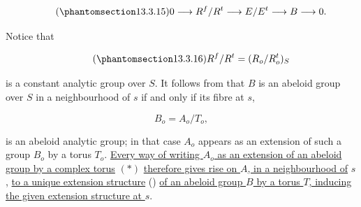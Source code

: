 \begin{equation}\tag{\SGARefTarget{sga7.sga7i.eix.n13-3-15}{13.3.15}}
 0\longrightarrow R^f/R^t\longrightarrow E/E^t
 \longrightarrow B\longrightarrow0.
\end{equation}

\noindent
Notice that

\begin{equation}\tag{\SGARefTarget{sga7.sga7i.eix.n13-3-16}{13.3.16}}
 R^f/R^t=(R_o/R_o^t)_S
\end{equation}

\noindent
is a constant analytic group over $S$. It follows from  that $B$
is an abeloid group over $S$ in a neighbourhood of $s$ if and only if
its fibre at $s$,

\begin{equation*}
 B_o=A_o/T_o,
\end{equation*}

\noindent
is an abeloid analytic group; in that case $A_o$ appears as an extension
of such a group $B_o$ by a torus $T_o$. \underline{Every way of writing
$A_o$ as an extension of an abeloid group by a complex torus} $(*)$
\underline{therefore gives rise on $A$, in a neighbourhood of} $s$, \underline{to a unique
extension structure} () \underline{of an abeloid group $B$ by a
torus $T$, inducing the given extension structure at $s$}.
